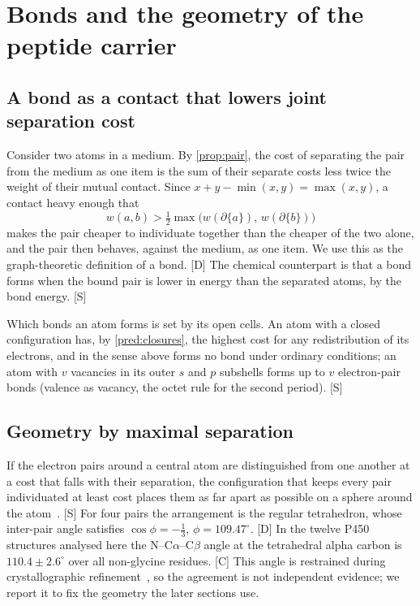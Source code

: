 \documentclass[10pt,twocolumn,a4paper]{article}
\newcommand{\cut}{\partial}
\newcommand{\D}{\textsf{[D]}}
\newcommand{\Sup}{\textsf{[S]}}
\newcommand{\C}{\textsf{[C]}}
\begin{document}
\section{Bonds and the geometry of the peptide carrier}
\label{sec:bonds}

\subsection{A bond as a contact that lowers joint separation cost}

Consider two atoms in a medium. By \cref{prop:pair}, the cost of separating
the pair from the medium as one item is the sum of their separate costs less
twice the weight of their mutual contact. Since
$x+y-\min(x,y)=\max(x,y)$, a contact heavy enough that
\begin{equation}
w(a,b)>\tfrac12\max\bigl(w(\cut\{a\}),\,w(\cut\{b\})\bigr)
\end{equation}
makes the pair cheaper to individuate together than the cheaper of the two
alone, and the pair then behaves, against the medium, as one item. We use
this as the graph-theoretic definition of a bond. \D{} The chemical
counterpart is that a bond forms when the bound pair is lower in energy than
the separated atoms, by the bond energy. \Sup

Which bonds an atom forms is set by its open cells. An atom with a closed
configuration has, by \cref{pred:closures}, the highest cost for any
redistribution of its electrons, and in the sense above forms no bond under
ordinary conditions; an atom with $v$ vacancies in its outer $s$ and $p$
subshells forms up to $v$ electron-pair bonds (valence as vacancy, the octet
rule for the second period). \Sup

\subsection{Geometry by maximal separation}

If the electron pairs around a central atom are distinguished from one
another at a cost that falls with their separation, the configuration that
keeps every pair individuated at least cost places them as far apart as
possible on a sphere around the atom~\citep{gillespie1957}. \Sup{} For four
pairs the arrangement is the regular tetrahedron, whose inter-pair angle
satisfies $\cos\phi=-\tfrac13$, $\phi=109.47^\circ$. \D{} In the twelve P450
structures analysed here the N--C$\alpha$--C$\beta$ angle at the tetrahedral
alpha carbon is $110.4\pm2.6^\circ$ over all non-glycine residues. \C{} This
angle is restrained during crystallographic refinement~\citep{engh1991}, so
the agreement is not independent evidence; we report it to fix the geometry
the later sections use.
\end{document}
